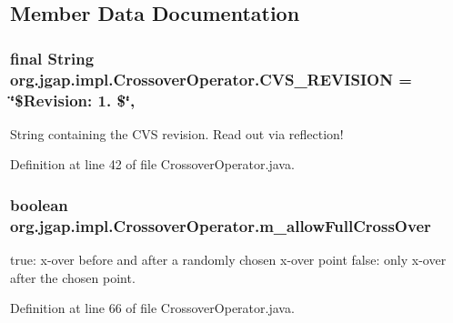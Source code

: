 \subsection{Member Data Documentation}
\hypertarget{classorg_1_1jgap_1_1impl_1_1_crossover_operator_aa73ddc68b26dbdc664092f82f5e2b25b}{
\subsubsection[{C\-V\-S\-\_\-\-R\-E\-V\-I\-S\-I\-O\-N}]{\setlength{\rightskip}{0pt plus 5cm}final String org.\-jgap.\-impl.\-Crossover\-Operator.\-C\-V\-S\-\_\-\-R\-E\-V\-I\-S\-I\-O\-N = \char`\"{}\$Revision\-: 1. \$\char`\"{}\hspace{0.3cm}{\ttfamily [static]}, {\ttfamily [private]}}}\label{classorg_1_1jgap_1_1impl_1_1_crossover_operator_aa73ddc68b26dbdc664092f82f5e2b25b}
String containing the C\-V\-S revision. Read out via reflection! 

Definition at line 42 of file Crossover\-Operator.\-java.

\hypertarget{classorg_1_1jgap_1_1impl_1_1_crossover_operator_abe148b3654e3083ae0136f95c3fc0a22}{
\subsubsection[{m\-\_\-allow\-Full\-Cross\-Over}]{\setlength{\rightskip}{0pt plus 5cm}boolean org.\-jgap.\-impl.\-Crossover\-Operator.\-m\-\_\-allow\-Full\-Cross\-Over\hspace{0.3cm}{\ttfamily [private]}}}\label{classorg_1_1jgap_1_1impl_1_1_crossover_operator_abe148b3654e3083ae0136f95c3fc0a22}
true\-: x-\/over before and after a randomly chosen x-\/over point false\-: only x-\/over after the chosen point. 

Definition at line 66 of file Crossover\-Operator.\-java.



